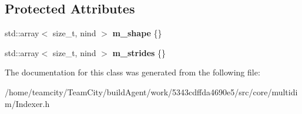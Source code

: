 \subsection*{Protected Attributes}
\begin{DoxyCompactItemize}
\item 
std\+::array$<$ size\+\_\+t, nind $>$ {\bfseries m\+\_\+shape} \{\}\hypertarget{classIndexer_aa64db6d52f3c04889c5a4dd2aa2f59e0}{}\label{classIndexer_aa64db6d52f3c04889c5a4dd2aa2f59e0}

\item 
std\+::array$<$ size\+\_\+t, nind $>$ {\bfseries m\+\_\+strides} \{\}\hypertarget{classIndexer_aeedf0d35f9da14d1946e5eb513bbb1f5}{}\label{classIndexer_aeedf0d35f9da14d1946e5eb513bbb1f5}

\end{DoxyCompactItemize}


The documentation for this class was generated from the following file\+:\begin{DoxyCompactItemize}
\item 
/home/teamcity/\+Team\+City/build\+Agent/work/5343cdffda4690e5/src/core/multidim/Indexer.\+h\end{DoxyCompactItemize}
